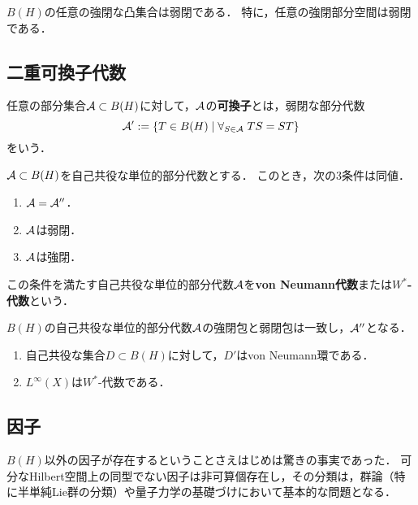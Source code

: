 \documentclass[uplatex,dvipdfmx]{jsreport}
\begin{document}
\begin{corollary}
    $B(H)$の任意の強閉な凸集合は弱閉である．
    特に，任意の強閉部分空間は弱閉である．
\end{corollary}

\subsection{二重可換子代数}

\begin{definition}[commutant]\label{def-commutant}
    任意の部分集合$\mathcal{A}\subset B(H)$に対して，$\mathcal{A}$の\textbf{可換子}とは，弱閉な部分代数
    \[\mathcal{A}':=\left\{T\in B(H)\mid\forall_{S\in\mathcal{A}}\;TS=ST\right\}\]
    をいう．
\end{definition}

\begin{theorem}\label{thm-double-commutant-theorem}
    $\mathcal{A}\subset B(H)$を自己共役な単位的部分代数とする．
    このとき，次の3条件は同値．
    \begin{enumerate}
        \item $\mathcal{A}=\mathcal{A}''$．
        \item $\mathcal{A}$は弱閉．
        \item $\mathcal{A}$は強閉．
    \end{enumerate}
    この条件を満たす自己共役な単位的部分代数$\mathcal{A}$を\textbf{von Neumann代数}または\textbf{$W^*$-代数}という．
\end{theorem}

\begin{corollary}
    $B(H)$の自己共役な単位的部分代数$\mathcal{A}$の強閉包と弱閉包は一致し，$\mathcal{A}''$となる．
\end{corollary}

\begin{example}\mbox{}
    \begin{enumerate}
        \item 自己共役な集合$D\subset B(H)$に対して，$D'$はvon Neumann環である．
        \item $L^\infty(X)$は$W^*$-代数である．
    \end{enumerate}
\end{example}

\subsection{因子}

\begin{tcolorbox}[colframe=ForestGreen, colback=ForestGreen!10!white,breakable,colbacktitle=ForestGreen!40!white,coltitle=black,fonttitle=\bfseries\sffamily,
title=]
    $B(H)$以外の因子が存在するということさえはじめは驚きの事実であった．
    可分なHilbert空間上の同型でない因子は非可算個存在し，その分類は，群論（特に半単純Lie群の分類）や量子力学の基礎づけにおいて基本的な問題となる．
\end{tcolorbox}
\end{document}
